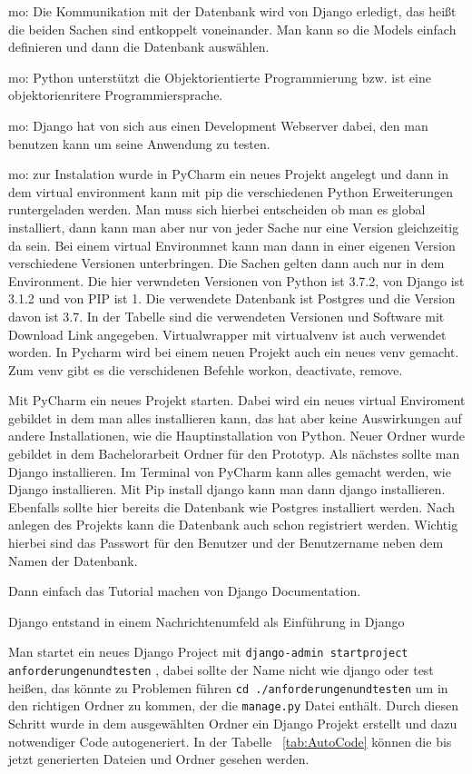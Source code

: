 \documentclass[11pt,a4paper]{report}
\begin{document}
mo: Die Kommunikation mit der Datenbank wird von Django erledigt, das heißt die beiden Sachen sind entkoppelt voneinander. Man kann so die Models einfach definieren und dann die Datenbank auswählen. 

mo: Python unterstützt die Objektorientierte Programmierung bzw. ist eine objektorienritere Programmiersprache. 

mo: Django hat von sich aus einen Development Webserver dabei, den man benutzen kann um seine Anwendung zu testen. 

mo: zur Instalation wurde in PyCharm ein neues Projekt angelegt und dann in dem virtual environment kann mit pip die verschiedenen Python Erweiterungen runtergeladen werden. Man muss sich hierbei entscheiden ob man es global installiert, dann kann man aber nur von jeder Sache nur eine Version gleichzeitig da sein. Bei einem virtual Environmnet kann man dann in einer eigenen Version verschiedene Versionen unterbringen. Die Sachen gelten dann auch nur in dem Environment. Die hier verwndeten Versionen von Python ist 3.7.2, von Django ist 3.1.2 und von PIP ist 1. Die verwendete Datenbank ist Postgres und die Version davon ist 3.7. In der Tabelle sind die verwendeten Versionen und Software mit Download Link angegeben. Virtualwrapper mit virtualvenv ist auch verwendet worden. In Pycharm wird bei einem neuen Projekt auch ein neues venv gemacht. Zum venv gibt es die verschidenen Befehle workon, deactivate, remove. 

Mit PyCharm ein neues Projekt starten. Dabei wird ein neues virtual Enviroment gebildet in dem man alles installieren kann, das hat aber keine Auswirkungen auf andere Installationen, wie die Hauptinstallation von Python. Neuer Ordner wurde gebildet in dem Bachelorarbeit Ordner für den Prototyp. Als nächstes sollte man Django installieren. Im Terminal von PyCharm kann alles gemacht werden, wie Django installieren. Mit Pip install django kann man dann django installieren. Ebenfalls sollte hier bereits die Datenbank wie Postgres installiert werden. Nach anlegen des Projekts kann die Datenbank auch schon registriert werden. Wichtig hierbei sind das Passwort für den Benutzer und der Benutzername neben dem Namen der Datenbank.

Dann einfach das Tutorial machen von Django Documentation.

Django entstand in einem Nachrichtenumfeld als Einführung in Django

Man startet ein neues Django Project mit 
\verb|django-admin startproject anforderungenundtesten|
, dabei sollte der Name nicht wie django oder test heißen, das könnte zu Problemen führen \verb|cd ./anforderungenundtesten| um in den richtigen Ordner zu kommen, der die \verb|manage.py|  Datei enthält. Durch diesen Schritt wurde in dem ausgewählten Ordner ein Django Projekt erstellt und dazu notwendiger Code autogeneriert. In der Tabelle ~\ref{tab:AutoCode} können die bis jetzt generierten Dateien und Ordner gesehen werden.
\end{document}
